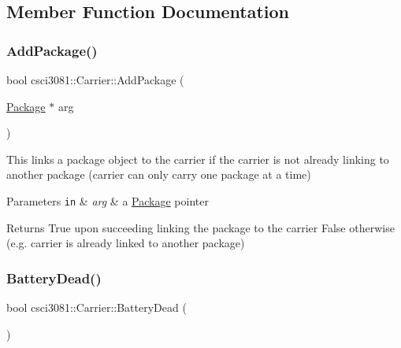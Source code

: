 \subsection{Member Function Documentation}
\mbox{\label{classcsci3081_1_1Carrier_a8b1996acbdeb796bcbc68f8d092e09c0}} 
\subsubsection{\texorpdfstring{Add\+Package()}{AddPackage()}}
{\footnotesize\ttfamily bool csci3081\+::\+Carrier\+::\+Add\+Package (\begin{DoxyParamCaption}\item[{\hyperlink{classcsci3081_1_1Package}{Package} $\ast$}]{arg }\end{DoxyParamCaption})}



This links a package object to the carrier if the carrier is not already linking to another package (carrier can only carry one package at a time) 


\begin{DoxyParams}[1]{Parameters}
\mbox{\tt in}  & {\em arg} & a \hyperlink{classcsci3081_1_1Package}{Package} pointer \\
\hline
\end{DoxyParams}
\begin{DoxyReturn}{Returns}
True upon succeeding linking the package to the carrier False otherwise (e.\+g. carrier is already linked to another package) 
\end{DoxyReturn}
\mbox{\label{classcsci3081_1_1Carrier_abbf8f72d3b13da90793555e25053d793}} 
\subsubsection{\texorpdfstring{Battery\+Dead()}{BatteryDead()}}
{\footnotesize\ttfamily bool csci3081\+::\+Carrier\+::\+Battery\+Dead (\begin{DoxyParamCaption}{ }\end{DoxyParamCaption})}




